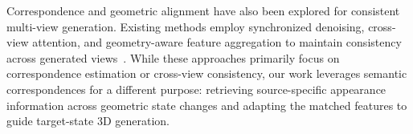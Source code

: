 Correspondence and geometric alignment have also been explored for consistent multi-view generation.
%
Existing methods employ synchronized denoising, cross-view attention, and geometry-aware feature aggregation to maintain consistency across generated views~\cite{shi2024mvdream,liu2024syncdreamer,hollein2024viewdiff,tang2023mvdiffusion,kant2024spad,huang2025mv,zhang2026align}.
%
While these approaches primarily focus on correspondence estimation or cross-view consistency, our work leverages semantic correspondences for a different purpose: retrieving source-specific appearance information across geometric state changes and adapting the matched features to guide target-state 3D generation.
